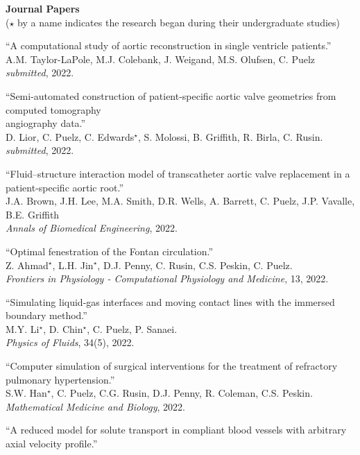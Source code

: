 \documentclass{article} %
\begin{document}
\vspace{0.5cm}
\noindent
{\bf \large Journal Papers}\\
{\footnotesize($\star$ by a name indicates the research began during their undergraduate studies)}
\begin{etaremune}
\item ``A computational study of aortic reconstruction in single ventricle patients.'' \\
A.M. Taylor-LaPole, M.J. Colebank, J. Weigand, M.S. Olufsen, C. Puelz \\
{\em submitted}, 2022.
\item ``Semi-automated construction of patient-specific aortic valve geometries from computed tomography\\ angiography data.'' \\
D. Lior, C. Puelz, C. Edwards$^\star$, S. Molossi, B. Griffith, R. Birla, C. Rusin. \\
{\em submitted}, 2022.
\item ``Fluid–structure interaction model of transcatheter aortic valve replacement in a patient-specific aortic root.'' \\
J.A. Brown, J.H. Lee, M.A. Smith, D.R. Wells, A. Barrett, C. Puelz, J.P. Vavalle, B.E. Griffith \\
{\em Annals of Biomedical Engineering}, 2022.
\item ``Optimal fenestration of the Fontan circulation.'' \\
Z. Ahmad$^\star$, L.H. Jin$^\star$, D.J. Penny, C. Rusin, C.S. Peskin, C. Puelz. \\
{\em Frontiers in Physiology - Computational Physiology and Medicine}, 13, 2022.
\item ``Simulating liquid-gas interfaces and moving contact lines with the immersed boundary method.'' \\
M.Y. Li$^\star$, D. Chin$^\star$, C. Puelz, P. Sanaei. \\
{\em Physics of Fluids}, 34(5), 2022.
\item ``Computer simulation of surgical interventions for the treatment of refractory pulmonary hypertension.'' \\
S.W. Han$^\star$, C. Puelz, C.G. Rusin, D.J. Penny, R. Coleman, C.S. Peskin. \\
{\em Mathematical Medicine and Biology}, 2022.
\item ``A reduced model for solute transport in compliant blood vessels with arbitrary axial velocity profile.'' \\

\end{etaremune}
\end{document}
